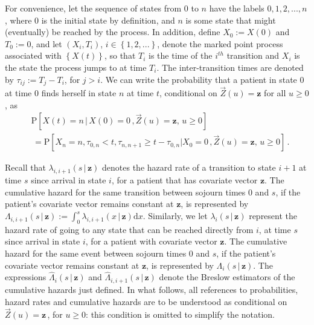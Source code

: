 For convenience, let the sequence of states from $0$ to $n$ have the labels $0,1,2,...,n\,$, where $0$ is the initial state by definition, and $n$ is some state that might (eventually) be reached by the process. In addition, define $X_{0}:=X(0)$ and $T_{0}:=0$, and let $\left(X_{i},T_{i}\right)$, $i \in \left\lbrace 1,2,... \right\rbrace$, denote the marked point process associated with $\left\lbrace X(t)\right\rbrace$, so that $T_{i}$ is the time of the $i^{th}$ transition and $X_{i}$ is the state the process jumps to at time $T_{i}$. 
The inter-transition times are denoted by  $\tau_{ij}:=T_{j}-T_{i}$, for $j>i$.
We can write the probability that a patient in state $0$ at time $0$ finds herself in state $n$ at time $t$, conditional on $\vec{Z}(u)=\mathbf{z}$ for all $u \geq 0$,  as
\begin{align*}
 &\mathrm{P}\left[X(t)=n\,|\,X(0)=0\,, \vec{Z}(u)=\mathbf{z},\,u \geq 0 \right]\\
 &\,=\mathrm{P}\left[X_{n}=n,\tau_{0,n} < t,\tau_{n,n+1}\geq t- \tau_{0,n} |X_{0}=0\,,  \vec{Z}(u)=\mathbf{z},\,u \geq 0 \right] \,.\nonumber
\end{align*}

Recall that $\lambda_{i,i+1}\left(s\,|\, \mathbf{z}\right)$ denotes the hazard rate of a transition to state $i+1$ at time $s$ since arrival in state $i$, for a  patient that has covariate vector $\mathbf{z}$. The cumulative hazard for the same transition between sojourn times $0$ and $s$, if the patient's covariate vector remains constant at $\mathbf{z}$, is represented by $\Lambda_{i,i+1}\left(s \,|\, \mathbf{z}\right):=\int_{0}^{s}\lambda_{i,i+1}\left(x\,|\, \mathbf{z}\right)\mathrm{d}x$.
 Similarly, we let $\lambda_{i}\left(s\,|\, \mathbf{z}\right)$ represent the hazard rate of going to any state that can be reached directly from $i$, at time $s$ since arrival in state $i$, for a patient with covariate vector $\mathbf{z}$. The cumulative hazard for the same event between sojourn times $0$ and $s$, if the patient's covariate vector remains constant at $\mathbf{z}$, is represented by $\Lambda_{i}\left(s \,|\, \mathbf{z}\right)$.
 The expressions $\hat{\Lambda}_{i}\left(s \,|\, \mathbf{z}\right)$ and $\hat{\Lambda}_{i,i+1}\left(s \,|\, \mathbf{z}\right)$ denote the Breslow estimators of the cumulative hazards just defined. 
 In what follows, all references to probabilities,  hazard rates and cumulative hazards are to be understood as conditional on  $\vec{Z}(u)=\mathbf{z}\,$, for $u\geq 0$: this condition is omitted to simplify the notation. 

